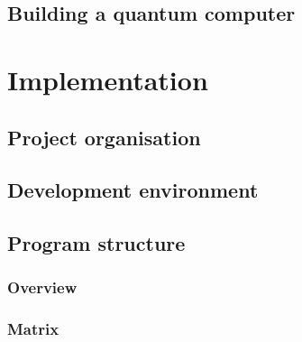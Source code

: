 \documentclass[bibliography=totocnumbered]{article}
\theoremstyle{NoticeStyle}
\begin{document}
\subsection{Building a quantum computer}\label{sec:Building a quantum computer}



%
\section{Implementation}

\subsection{Project organisation}

\subsection{Development environment}

\subsection{Program structure}

%
\subsubsection{Overview}

\subsubsection{Matrix}
\end{document}

